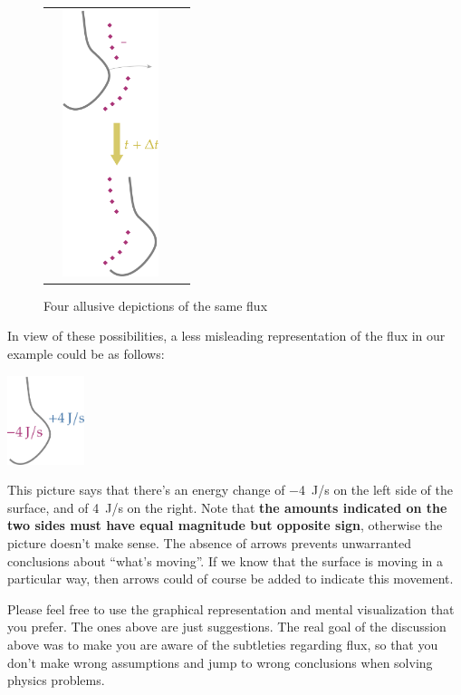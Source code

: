\documentclass[a4paper,12pt,%
onecolumn,oneside,titlepage,%
british%
]{memoir}
\renewcommand*{\|}[1][]{\nonscript\:#1\vert\nonscript\:\mathopen{}}
\begin{document}
\begin{figure}[h]
\begin{tabularx}{\linewidth}{|X|X|X|X|}
&
\centering   \includegraphics[align=t,height=21em]{flux_ms.pdf}
  \end{tabularx}
  \caption{Four allusive depictions of the same flux}\label{fig:flux_interpretation}
\end{figure}

\medskip

\begin{samepage}
  In view of these possibilities, a less misleading representation of the flux in our example could be as follows:
  \begin{center}
    \includegraphics[height=7em]{flux_both.pdf}
  \end{center}
\end{samepage}
This picture says that there's an energy change of \qty{-4}{J/s} on the left side of the surface, and of \qty{+4}{J/s} on the right. Note that \textbf{the amounts indicated on the two sides must have equal magnitude but opposite sign}, otherwise the picture doesn't make sense. The absence of arrows prevents unwarranted conclusions about \enquote{what's moving}. If we know that the surface is moving in a particular way, then arrows could of course be added to indicate this movement.

\smallskip

Please feel free to use the graphical representation and mental visualization that you prefer. The ones above are just suggestions. The real goal of the discussion above was to make you are aware of the subtleties regarding flux, so that you don't make wrong assumptions and jump to wrong conclusions when solving physics problems.
\end{document}
